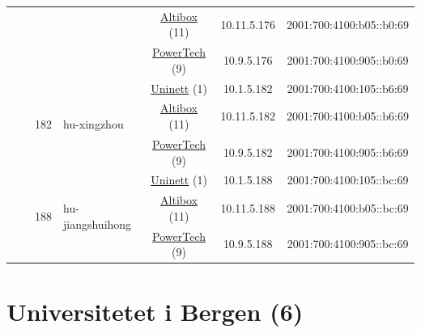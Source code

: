 \begin{small}
\begin{center}
\begin{longtable}{|c|c|c|c|c|c|c|c|}
  &  &  &  & \multicolumn{2}{|c|}{\tiny{\href{https://www.altibox.no}{Altibox} (11)}} & \tiny{10.11.5.176} & \tiny{2001:700:4100:b05::b0:69} \\* \cline{5-5}\cline{6-6}\cline{7-7}\cline{8-8}
  &  &  &  & \multicolumn{2}{|c|}{\tiny{\href{http://www.powertech.no}{PowerTech} (9)}} & \tiny{10.9.5.176} & \tiny{2001:700:4100:905::b0:69} \\* \cline{3-3}\cline{4-4}\cline{5-5}\cline{6-6}\cline{7-7}\cline{8-8}
  &  & \multirow{3}{*}{\tiny{182}} & \multicolumn{1}{|l|}{\multirow{3}{*}{\tiny{hu-xingzhou}}} & \multicolumn{2}{|c|}{\tiny{\href{https://www.uninett.no}{Uninett} (1)}} & \tiny{10.1.5.182} & \tiny{2001:700:4100:105::b6:69} \\* \cline{5-5}\cline{6-6}\cline{7-7}\cline{8-8}
  &  &  &  & \multicolumn{2}{|c|}{\tiny{\href{https://www.altibox.no}{Altibox} (11)}} & \tiny{10.11.5.182} & \tiny{2001:700:4100:b05::b6:69} \\* \cline{5-5}\cline{6-6}\cline{7-7}\cline{8-8}
  &  &  &  & \multicolumn{2}{|c|}{\tiny{\href{http://www.powertech.no}{PowerTech} (9)}} & \tiny{10.9.5.182} & \tiny{2001:700:4100:905::b6:69} \\* \cline{3-3}\cline{4-4}\cline{5-5}\cline{6-6}\cline{7-7}\cline{8-8}
  &  & \multirow{3}{*}{\tiny{188}} & \multicolumn{1}{|l|}{\multirow{3}{*}{\tiny{hu-jiangshuihong}}} & \multicolumn{2}{|c|}{\tiny{\href{https://www.uninett.no}{Uninett} (1)}} & \tiny{10.1.5.188} & \tiny{2001:700:4100:105::bc:69} \\* \cline{5-5}\cline{6-6}\cline{7-7}\cline{8-8}
  &  &  &  & \multicolumn{2}{|c|}{\tiny{\href{https://www.altibox.no}{Altibox} (11)}} & \tiny{10.11.5.188} & \tiny{2001:700:4100:b05::bc:69} \\* \cline{5-5}\cline{6-6}\cline{7-7}\cline{8-8}
  &  &  &  & \multicolumn{2}{|c|}{\tiny{\href{http://www.powertech.no}{PowerTech} (9)}} & \tiny{10.9.5.188} & \tiny{2001:700:4100:905::bc:69} \\ \hline
\end{longtable}
\end{center}
\end{small}



\section{Universitetet i Bergen (6)}
\label{sec:UiB}

